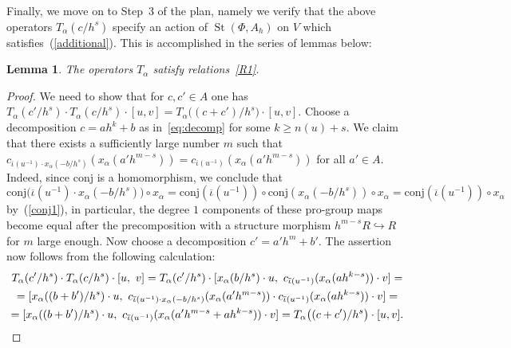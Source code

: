\documentclass[oneside, 11pt]{amsart}
\numberwithin{equation}{section}
\newtheorem{lemma}{Lemma} \numberwithin{lemma}{section}
\newcommand{\St}{\mathop{\mathrm{St}}\nolimits}
\theoremstyle{definition}
\theoremstyle{definition}
\theoremstyle{remark}
\begin{document}
Finally, we move on to Step~3 of the plan, namely we verify that the above operators $T_\alpha(c/h^s)$ specify an action of $\St(\Phi, A_{h})$ on $V$ which satisfies~(\ref{additional}).
This is accomplished in the series of lemmas below:

\begin{lemma}\label{lem:R1} The operators $T_\alpha$ satisfy relations~\eqref{R1}. \end{lemma}
\begin{proof}
We need to show that for $c, c' \in A$ one has $\textstyle
T_\alpha(c'/{h^s}) \cdot T_\alpha(c/h^s) \cdot [u, v] = T_\alpha\bigl((c+c')/h^s\bigr) \cdot [u, v].$
Choose a decomposition $c = ah^k + b$ as in~\eqref{eq:decomp} for some $k \geq n(u) + s$.
We claim that there exists a sufficiently large number $m$ such that $c_{\overline{\iota}(u^{-1}) \cdot x_\alpha(-b/h^s)}(x_\alpha(a'h^{m-s})) = c_{\overline{\iota}(u^{-1})}(x_\alpha(a'h^{m-s}))$ for all $a'\in A$. Indeed, since $\mathrm{conj}$ is a homomorphism, we conclude that
$$
\mathrm{conj}\big(\overline{\iota}(u^{-1}) \cdot x_\alpha(-b/h^s)\big)\circ x_\alpha=\mathrm{conj}(\overline{\iota}(u^{-1}))\circ\mathrm{conj}(x_\alpha(-b/h^s))\circ x_\alpha=\mathrm{conj}(\overline{\iota}(u^{-1}))\circ x_\alpha
$$
by~(\ref{conj1}), in particular, the degree $1$ components of these pro-group maps become equal after the precomposition with a structure morphism $h^{m-s}R\hookrightarrow R$ for $m$ large enough. 
Now choose a decomposition $c' = a' h^m + b'$.
The assertion now follows from the following calculation:
\begin{multline*}
 T_\alpha(c'/{h^s}) \cdot T_\alpha(c/h^s) \cdot [u,\ v] = T_\alpha(c'/h^s) \cdot [x_\alpha(b/h^s)\cdot u,\ c_{\overline{\iota}(u^{-1})}(x_\alpha(ah^{k-s})) \cdot v] = \\
 = [x_\alpha((b + b')/h^s)\cdot u,\ c_{\overline{\iota}(u^{-1}) \cdot x_\alpha(-b/h^s)}(x_\alpha(a'h^{m-s})) \cdot c_{\overline{\iota}(u^{-1})}(x_\alpha(ah^{k-s})) \cdot v] = \\ = [x_\alpha((b + b')/h^s)\cdot u,\  c_{\overline{\iota}(u^{-1})}(x_\alpha(a'h^{m-s} + ah^{k-s})) \cdot v] = T_\alpha\bigl((c+c')/h^s\bigr) \cdot [u, v]. \qedhere
\end{multline*}
\end{proof}
\end{document}
